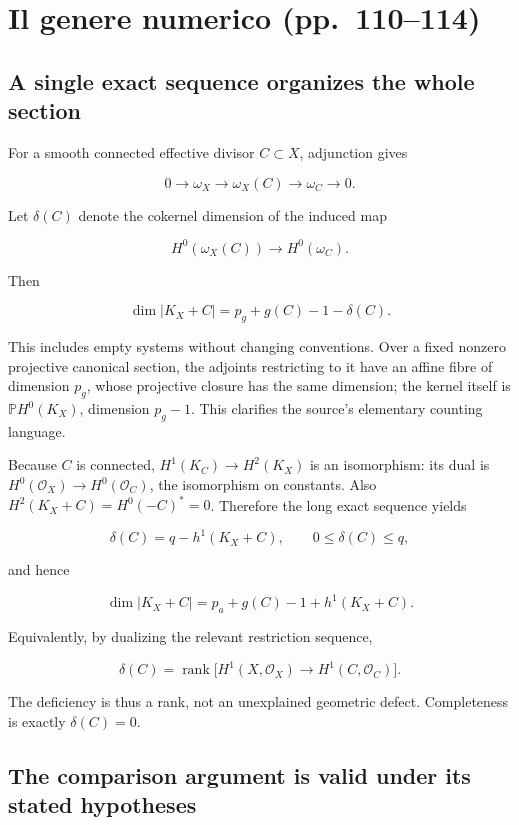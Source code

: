 \section[Il genere numerico]{Il genere numerico (pp.~110--114)}\label{enriques-iv-4}

\subsection{A single exact sequence organizes the whole section}

For a smooth connected effective divisor \(C\subset X\), adjunction gives

\[
 0\longrightarrow\omega_X\longrightarrow\omega_X(C)
 \longrightarrow\omega_C\longrightarrow0. \tag{IV.4.1}
\]

Let \(\delta(C)\) denote the cokernel dimension of the induced map

\[
H^0(\omega_X(C))\to H^0(\omega_C).
\]

Then

\[
 \dim|K_X+C|=p_g+g(C)-1-\delta(C). \tag{IV.4.2}
\]

This includes empty systems without changing conventions. Over a fixed nonzero projective canonical section, the adjoints restricting to it have an affine fibre of dimension \(p_g\), whose projective closure has the same dimension; the kernel itself is \(\mathbb P H^0(K_X)\), dimension \(p_g-1\). This clarifies the source's elementary counting language.

Because \(C\) is connected, \(H^1(K_C)\to H^2(K_X)\) is an isomorphism: its dual is \(H^0(\mathcal O_X)\to H^0(\mathcal O_C)\), the isomorphism on constants. Also \(H^2(K_X+C)=H^0(-C)^*=0\). Therefore the long exact sequence yields

\[
 \delta(C)=q-h^1(K_X+C),\qquad 0\leq\delta(C)\leq q, \tag{IV.4.3}
\]

and hence

\[
 \dim|K_X+C|=p_a+g(C)-1+h^1(K_X+C). \tag{IV.4.4}
\]

Equivalently, by dualizing the relevant restriction sequence,

\[
 \delta(C)=\operatorname{rank}\bigl[H^1(X,\mathcal O_X)
 \longrightarrow H^1(C,\mathcal O_C)\bigr].
\]

The deficiency is thus a rank, not an unexplained geometric defect. Completeness is exactly \(\delta(C)=0\).

\subsection{The comparison argument is valid under its stated hypotheses}

